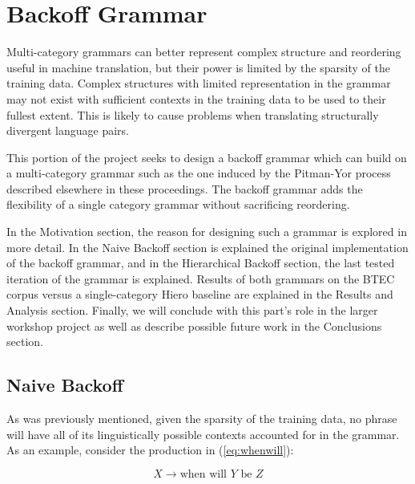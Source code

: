 
\maketitle

\section{Backoff Grammar}

Multi-category grammars can better represent complex structure and reordering useful in machine translation, but their power is limited by the sparsity of the training data.  Complex structures with limited representation in the grammar may not exist with sufficient contexts in the training data to be used to their fullest extent.  This is likely to cause problems when translating structurally divergent language pairs.

This portion of the project seeks to design a backoff grammar which can build on a multi-category grammar such as the one induced by the Pitman-Yor process described elsewhere in these proceedings.  The backoff grammar adds the flexibility of a single category grammar without sacrificing reordering.

In the Motivation section, the reason for designing such a grammar is explored in more detail.  In the Naive Backoff section is explained the original implementation of the backoff grammar, and in the Hierarchical Backoff section, the last tested iteration of the grammar is explained.  Results of both grammars on the BTEC corpus versus a single-category Hiero baseline are explained in the Results and Analysis section.  Finally, we will conclude with this part's role in the larger workshop project as well as describe possible future work in the Conclusions section.

\subsection{Naive Backoff}

As was previously mentioned, given the sparsity of the training data, no phrase will have all of its linguistically possible contexts accounted for in the grammar.  As an example, consider the production in (\ref{eq:whenwill}):

\begin{equation}\label{eq:whenwill}
X \rightarrow \text{when will }Y\text{ be }Z
\end{equation}

